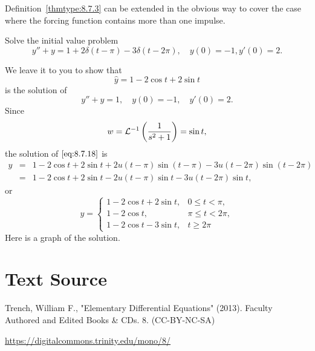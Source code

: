 \documentclass{ximera}
\begin{document}
Definition~\ref{thmtype:8.7.3} can be extended in the obvious way to cover
the case where the forcing function contains more than one impulse.
\begin{example}\label{example:8.7.3}
Solve the  initial value problem
\begin{equation} \label{eq:8.7.18}
y''+y=1+2\delta(t-\pi)-3\delta(t-2\pi), \quad    y(0)=-1,   y'(0)=2.
\end{equation}
\begin{explanation}
We leave it to you to show that
$$
\hat y= 1-2\cos t+2\sin t
$$
is the solution of
$$
y''+y=1, \quad    y(0)=-1,\quad    y'(0)=2.
$$
Since
$$
w={\cal L}^{-1}\left(\frac{1}{s^2+1}\right)=\sin t,
$$
the solution of  $\eqref{eq:8.7.18}$ is
\begin{eqnarray*}
y&=&1-2\cos t+2\sin t+2u(t-\pi)\sin(t-\pi)-3u(t-2\pi)\sin(t-2\pi)\\
&=&1-2\cos t+2\sin t-2u(t-\pi)\sin t-3u(t-2\pi)\sin t,
\end{eqnarray*}
or
\begin{equation} \label{eq:8.7.19}
y=\left\{\begin{array}{cl} 1-2\cos t+2\sin t,&0\leq t<\pi,\\
1-2\cos t,&\pi\leq t<2\pi,\\
1-2\cos t-3\sin t,&t\geq 2\pi\end{array}\right.
\end{equation}
Here is a graph of the solution.

\begin{center}
\end{center}

\end{explanation}
\end{example}


\section*{Text Source}
Trench, William F., "Elementary Differential Equations" (2013). Faculty Authored and Edited Books \& CDs. 8. (CC-BY-NC-SA)

\href{https://digitalcommons.trinity.edu/mono/8/}{https://digitalcommons.trinity.edu/mono/8/}
\end{document}
